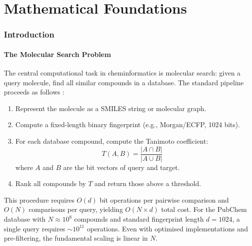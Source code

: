 \documentclass[11pt,a4paper]{article}
\theoremstyle{definition}
\theoremstyle{remark}
\begin{document}
\begin{abstract}
\end{abstract}

\tableofcontents
\newpage


\part{Mathematical Foundations}

\section{Introduction}
\label{sec:introduction}

\subsection{The Molecular Search Problem}

The central computational task in cheminformatics is molecular search: given a query molecule, find all similar compounds in a database. The standard pipeline proceeds as follows \citep{rogers2010, willett1998}:

\begin{enumerate}[nosep]
\item Represent the molecule as a SMILES string or molecular graph.
\item Compute a fixed-length binary fingerprint (e.g., Morgan/ECFP, 1024 bits).
\item For each database compound, compute the Tanimoto coefficient:
\begin{equation}
T(A, B) = \frac{|A \cap B|}{|A \cup B|}
\label{eq:tanimoto}
\end{equation}
where $A$ and $B$ are the bit vectors of query and target.
\item Rank all compounds by $T$ and return those above a threshold.
\end{enumerate}

This procedure requires $O(d)$ bit operations per pairwise comparison and $O(N)$ comparisons per query, yielding $O(N \times d)$ total cost. For the PubChem database \citep{kim2023} with $N \approx 10^8$ compounds and standard fingerprint length $d = 1024$, a single query requires $\sim 10^{11}$ operations. Even with optimised implementations and pre-filtering, the fundamental scaling is linear in $N$.
\end{document}
